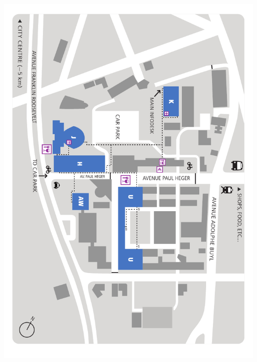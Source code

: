 \documentclass[a4paper,10pt]{article}
\begin{document}



\label{backcover}%
\includegraphics[width=\textwidth]{artwork/campusmap}
\end{document}
